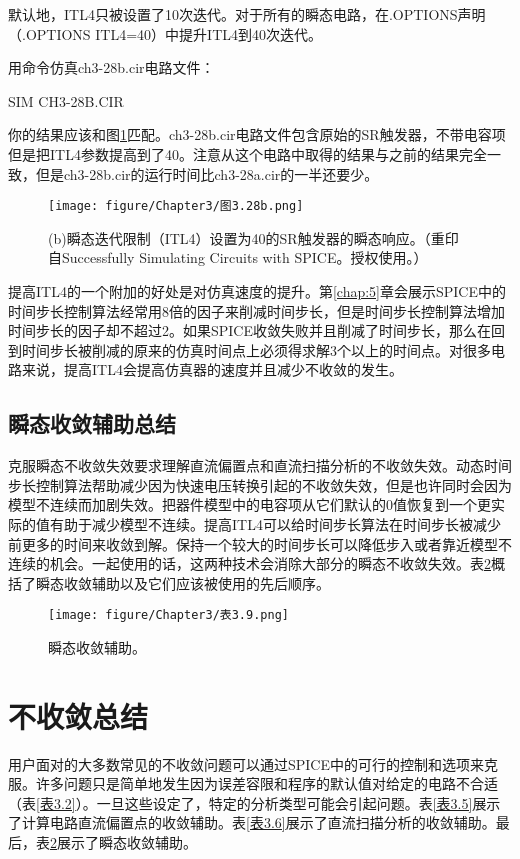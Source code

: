 默认地，ITL4只被设置了10次迭代。对于所有的瞬态电路，在.OPTIONS声明（.OPTIONS ITL4=40）中提升ITL4到40次迭代。

用命令仿真ch3-28b.cir电路文件：

SIM CH3-28B.CIR

你的结果应该和图\ref{图3.28b}匹配。ch3-28b.cir电路文件包含原始的SR触发器，不带电容项但是把ITL4参数提高到了40。注意从这个电路中取得的结果与之前的结果完全一致，但是ch3-28b.cir的运行时间比ch3-28a.cir的一半还要少。

\begin{figure}[htbp]
\small
    \centering
    \texttt{[image: figure/Chapter3/图3.28b.png]}
    \caption{(b)瞬态迭代限制（ITL4）设置为40的SR触发器的瞬态响应。（重印自Successfully Simulating Circuits with SPICE。授权使用。）}
    \label{图3.28b}
\end{figure}

提高ITL4的一个附加的好处是对仿真速度的提升。第\ref{chap:5}章会展示SPICE中的时间步长控制算法经常用8倍的因子来削减时间步长，但是时间步长控制算法增加时间步长的因子却不超过2。如果SPICE收敛失败并且削减了时间步长，那么在回到时间步长被削减的原来的仿真时间点上必须得求解3个以上的时间点。对很多电路来说，提高ITL4会提高仿真器的速度并且减少不收敛的发生。

\subsection{瞬态收敛辅助总结}
克服瞬态不收敛失效要求理解直流偏置点和直流扫描分析的不收敛失效。动态时间步长控制算法帮助减少因为快速电压转换引起的不收敛失效，但是也许同时会因为模型不连续而加剧失效。把器件模型中的电容项从它们默认的0值恢复到一个更实际的值有助于减少模型不连续。提高ITL4可以给时间步长算法在时间步长被减少前更多的时间来收敛到解。保持一个较大的时间步长可以降低步入或者靠近模型不连续的机会。一起使用的话，这两种技术会消除大部分的瞬态不收敛失效。表\ref{表3.9}概括了瞬态收敛辅助以及它们应该被使用的先后顺序。

\begin{figure}[htbp]
\small
    \centering
    \texttt{[image: figure/Chapter3/表3.9.png]}
    \caption{瞬态收敛辅助。}
    \label{表3.9}
\end{figure}

\section{不收敛总结}
用户面对的大多数常见的不收敛问题可以通过SPICE中的可行的控制和选项来克服。许多问题只是简单地发生因为误差容限和程序的默认值对给定的电路不合适（表\ref{表3.2}）。一旦这些设定了，特定的分析类型可能会引起问题。表\ref{表3.5}展示了计算电路直流偏置点的收敛辅助。表\ref{表3.6}展示了直流扫描分析的收敛辅助。最后，表\ref{表3.9}展示了瞬态收敛辅助。

